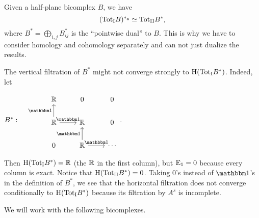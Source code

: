 \documentclass[\MainFolder/Text.tex]{subfiles}
\begin{document}
\begin{Remark}\label{Rem:SpecSeq}
\begin{RemarkList}
\item Given a half-plane bicomplex $B$, we have
\[ ({\mathrm{Tot}_{\mathrm{I}}} B)^{*_{\mathrm{g}}} \simeq {\mathrm{Tot}_{\mathrm{II}}} B^*, \]
where $B^* = \bigoplus_{i,j} B_{ij}^*$ is the ``pointwise dual'' to $B$. This is why we have to consider homology and cohomology separately and can not just dualize the results.
\item The vertical filtration of $B^*$ might not converge strongly to $\mathrm{H}({\mathrm{Tot}_{\mathrm{I}}} B^*)$. Indeed, let
\begin{center}
$B^*: \quad \begin{tikzcd}
 \R & 0 & 0  \\
 \R\arrow{u}{\Id}\arrow{r}{\Id} & \R & 0   \\
 0 & \R\arrow{u}{\Id}\arrow{r}{\Id} & \dotsb
\end{tikzcd}$.
\end{center}
Then $\mathrm{H}({\mathrm{Tot}_{\mathrm{I}}} B^*) = \mathbb{R}$ (the $\mathbb{R}$ in the first column), but $\mathrm{E}_1 = 0$ because every column is exact. Notice that $\mathrm{H}({\mathrm{Tot}_{\mathrm{II}}} B^*) = 0$. Taking $0$'s instead of $\Id$'s in the definition of $B^*$, we see that the horizontal filtration does not converge conditionally to $\mathrm{H}({\mathrm{Tot}_{\mathrm{I}}} B^*)$ because its filtration by $A^s$ is incomplete.
\qedhere
\end{RemarkList}
\end{Remark}

We will work with the following bicomplexes.
\end{document}
